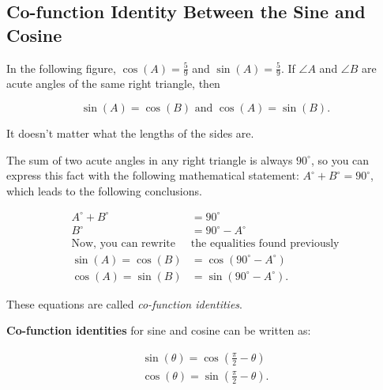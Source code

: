 \subsection{Co-function Identity Between the Sine and Cosine}
\label{sub_sec:co_function_identity_between_the_sine_and_cosine}

In the following figure, $\cos(A) = \frac{5}{9}$ and $\sin(A) = \frac{5}{9}$.
If $\angle A$ and $\angle B$ are acute angles of the same right triangle, then

\begin{figure}[htpb]
  \centering


  \label{fig:find_tan_a}
\end{figure}

\[ \sin(A) = \cos(B) \textrm{ and } \cos(A) = \sin(B) . \]

It doesn't matter what the lengths of the sides are.

The sum of two acute angles in any right triangle is always $90^{\circ}$, so
you can express this fact with the following mathematical statement: $A^{\circ}
+ B^{\circ} = 90^{\circ}$, which leads to the following conclusions.

\begin{align*}
  A^{\circ} + B^{\circ} &= 90^{\circ} \\
  B^{\circ} &= 90^{\circ} - A^{\circ} \\
  \textrm{Now, you can rewrite }&\textrm{the equalities found previously} \\
  \sin(A) = \cos(B) &= \cos(90^{\circ} - A^{\circ}) \\
  \cos(A) = \sin(B) &= \sin(90^{\circ} - A^{\circ})
.\end{align*}

These equations are called \textit{co-function identities}.

\begin{identity}[Co-Function]
  \label{idn:co_function}

  \textbf{Co-function identities} for sine and cosine can be written as:

  \begin{align*}
    \sin(\theta) = \cos\left(\frac{\pi}{2} - \theta\right) \\
    \cos(\theta) = \sin\left(\frac{\pi}{2} - \theta\right)
  .\end{align*}
\end{identity}

